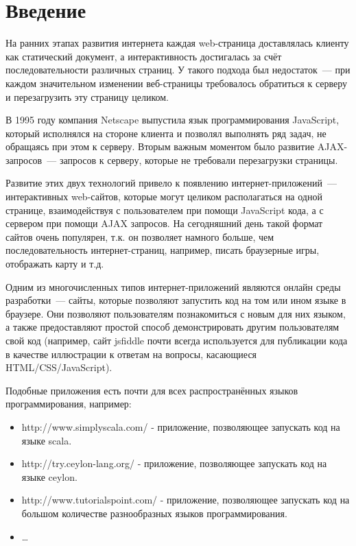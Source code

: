\chapter*{Введение}

	На ранних этапах развития интернета каждая web-страница доставлялась клиенту как статический документ, а интерактивность достигалась за счёт последовательности различных страниц. У такого подхода был недостаток~--- при каждом значительном изменении веб-страницы требовалось обратиться к серверу и перезагрузить эту страницу целиком. 

	В 1995 году компания Netscape выпустила язык программирования 
Java\-Script, который исполнялся на стороне клиента и позволял выполнять ряд задач, не обращаясь при этом к серверу. Вторым важным моментом было развитие AJAX-запросов~--- запросов к серверу, которые не требовали перезагрузки страницы. 
	
	Развитие этих двух технологий привело к появлению интернет-приложе\-ний~--- интерактивных web-сайтов, которые могут целиком располагаться на одной странице,  взаимодействуя с пользователем при помощи JavaScript кода, а с сервером при помощи AJAX запросов. На сегодняшний день такой формат сайтов очень популярен, т.к. он позволяет намного больше, чем последовательность интернет-страниц, например, писать браузерные игры, отображать карту и т.д.
	
	Одним из многочисленных типов интернет-приложений являются онлайн среды разработки~--- сайты, которые позволяют запустить код на том или ином языке в браузере. Они позволяют пользователям познакомиться с новым для них языком, а также предоставляют простой способ демонстрировать другим пользователям свой код (например, сайт jsfiddle почти всегда используется для публикации кода в качестве иллюстрации к ответам на вопросы, касающиеся HTML/CSS/JavaScript).
	
	Подобные приложения есть почти для всех распространённых языков программирования, например:
\begin{itemize}
	\item http://www.simplyscala.com/ - приложение, позволяющее запускать код на языке scala. 
	\item http://try.ceylon-lang.org/ - приложение, позволяющее запускать код на языке ceylon.
	\item http://www.tutorialspoint.com/ - приложение, позволяющее запускать код на большом количестве разнообразных языков программирования.
	\item \dots
\end{itemize}


